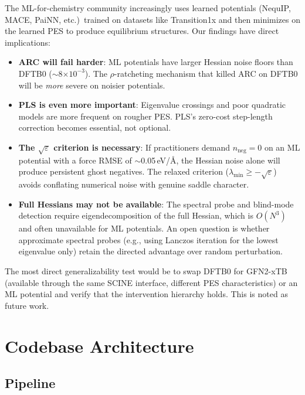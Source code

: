 \documentclass[11pt,a4paper]{article}
\theoremstyle{definition}
\begin{document}
The ML-for-chemistry community increasingly uses learned potentials
(NequIP, MACE, PaiNN, etc.)\ trained on datasets like Transition1x and
then minimizes on the learned PES to produce equilibrium structures.
Our findings have direct implications:

\begin{itemize}[nosep]
  \item \textbf{ARC will fail harder}: ML potentials have larger Hessian
    noise floors than DFTB0 ($\sim$8$\times10^{-3}$).  The
    $\rho$-ratcheting mechanism that killed ARC on DFTB0 will be
    \emph{more} severe on noisier potentials.
  \item \textbf{PLS is even more important}: Eigenvalue crossings and
    poor quadratic models are more frequent on rougher PES.  PLS's
    zero-cost step-length correction becomes essential, not optional.
  \item \textbf{The $\sqrt{\varepsilon}$ criterion is necessary}: If
    practitioners demand $n_\text{neg}=0$ on an ML potential with a
    force RMSE of $\sim$0.05\,eV/\AA, the Hessian noise alone will
    produce persistent ghost negatives.  The relaxed criterion
    ($\lambda_\text{min} \geq -\sqrt{\varepsilon}$) avoids conflating
    numerical noise with genuine saddle character.
  \item \textbf{Full Hessians may not be available}: The spectral probe
    and blind-mode detection require eigendecomposition of the full
    Hessian, which is $O(N^3)$ and often unavailable for ML potentials.
    An open question is whether approximate spectral probes (e.g., using
    Lanczos iteration for the lowest eigenvalue only) retain the directed
    advantage over random perturbation.
\end{itemize}

The most direct generalizability test would be to swap DFTB0 for
GFN2-xTB (available through the same SCINE interface, different PES
characteristics) or an ML potential and verify that the intervention
hierarchy holds.  This is noted as future work.

\section{Codebase Architecture}
\label{sec:architecture}

\subsection{Pipeline}
\end{document}
